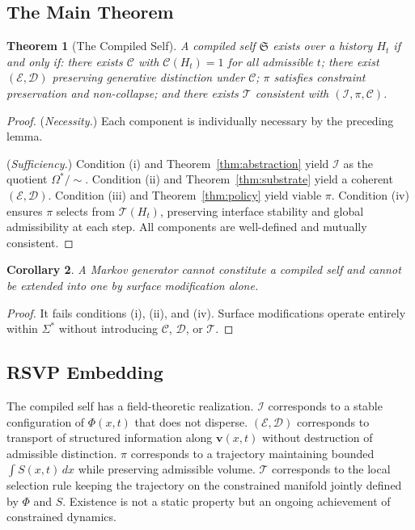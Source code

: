 \documentclass[12pt, a4paper]{article}
\theoremstyle{plain}
\newtheorem{theorem}{Theorem}[section]
\newtheorem{corollary}[theorem]{Corollary}
\theoremstyle{definition}
\theoremstyle{remark}
\begin{document}
\subsection{The Main Theorem}

\begin{theorem}[The Compiled Self]
\label{thm:self}
A compiled self $\mathfrak{S}$ exists over a history $H_t$ if and only if: there exists $\mathcal{C}$ with $\mathcal{C}(H_t) = 1$ for all admissible $t$; there exist $(\mathcal{E}, \mathcal{D})$ preserving generative distinction under $\mathcal{C}$; $\pi$ satisfies constraint preservation and non-collapse; and there exists $\mathcal{T}$ consistent with $(\mathcal{I}, \pi, \mathcal{C})$.
\end{theorem}

\begin{proof}
(\textit{Necessity.}) Each component is individually necessary by the preceding lemma.

(\textit{Sufficiency.}) Condition (i) and Theorem~\ref{thm:abstraction} yield $\mathcal{I}$ as the quotient $\Omega^*/{\sim}$. Condition (ii) and Theorem~\ref{thm:substrate} yield a coherent $(\mathcal{E},\mathcal{D})$. Condition (iii) and Theorem~\ref{thm:policy} yield viable $\pi$. Condition (iv) ensures $\pi$ selects from $\mathcal{T}(H_t)$, preserving interface stability and global admissibility at each step. All components are well-defined and mutually consistent.
\end{proof}

\begin{corollary}
A Markov generator cannot constitute a compiled self and cannot be extended into one by surface modification alone.
\end{corollary}

\begin{proof}
It fails conditions (i), (ii), and (iv). Surface modifications operate entirely within $\Sigma^*$ without introducing $\mathcal{C}$, $\mathcal{D}$, or $\mathcal{T}$.
\end{proof}

\subsection{RSVP Embedding}

The compiled self has a field-theoretic realization. $\mathcal{I}$ corresponds to a stable configuration of $\Phi(x,t)$ that does not disperse. $(\mathcal{E},\mathcal{D})$ corresponds to transport of structured information along $\mathbf{v}(x,t)$ without destruction of admissible distinction. $\pi$ corresponds to a trajectory maintaining bounded $\int S(x,t)\,dx$ while preserving admissible volume. $\mathcal{T}$ corresponds to the local selection rule keeping the trajectory on the constrained manifold jointly defined by $\Phi$ and $S$. Existence is not a static property but an ongoing achievement of constrained dynamics.
\end{document}
